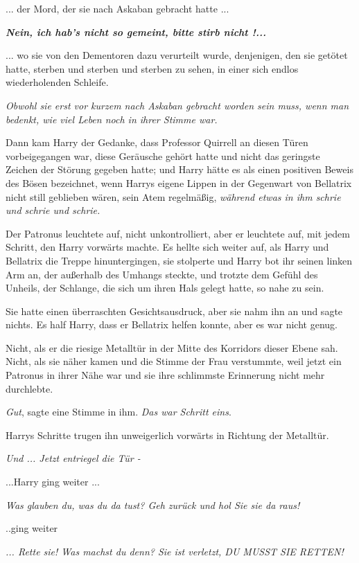 ... der Mord, der sie nach Askaban gebracht hatte ...

\textbf{\emph{\glqq{}Nein, ich hab's
nicht so gemeint, bitte stirb nicht !...\grqq{}} }

... wo sie von den Dementoren dazu verurteilt wurde, denjenigen, den sie getötet
hatte, sterben und sterben und sterben zu sehen, in einer sich endlos
wiederholenden Schleife.

\emph{Obwohl sie erst vor kurzem nach Askaban gebracht worden sein muss, wenn
man bedenkt, wie viel Leben noch in ihrer Stimme war.}

Dann kam Harry der Gedanke, dass Professor Quirrell an diesen Türen
vorbeigegangen war, diese Geräusche gehört hatte und nicht das geringste Zeichen
der Störung gegeben hatte; und Harry hätte es als einen positiven Beweis des
Bösen bezeichnet, wenn Harrys eigene Lippen in der Gegenwart von Bellatrix nicht
still geblieben wären, sein Atem regelmäßig, \emph{während etwas in ihm schrie
und schrie und schrie.}

Der Patronus leuchtete auf, nicht unkontrolliert, aber er leuchtete auf, mit
jedem Schritt, den Harry vorwärts machte. Es hellte sich weiter auf, als Harry
und Bellatrix die Treppe hinuntergingen, sie stolperte und Harry bot ihr seinen
linken Arm an, der außerhalb des Umhangs steckte, und trotzte dem Gefühl des
Unheils, der Schlange, die sich um ihren Hals gelegt hatte, so nahe zu sein.

Sie hatte einen überraschten Gesichtsausdruck, aber sie nahm ihn an und sagte
nichts. Es half Harry, dass er Bellatrix helfen konnte, aber es war nicht genug.

Nicht, als er die riesige Metalltür in der Mitte des Korridors dieser Ebene sah.
Nicht, als sie näher kamen und die Stimme der Frau verstummte, weil jetzt ein
Patronus in ihrer Nähe war und sie ihre schlimmste Erinnerung nicht mehr
durchlebte.

\emph{Gut}, sagte eine Stimme in ihm. \emph{Das war Schritt eins}.

Harrys Schritte trugen ihn unweigerlich vorwärts in Richtung der Metalltür.

\emph{Und ... Jetzt entriegel die Tür -}

...Harry ging weiter ...

\emph{Was glauben du, was du da tust? Geh zurück und hol Sie sie da raus!}

..ging weiter

\emph{... Rette sie! Was machst du denn? Sie ist verletzt, DU MUSST SIE RETTEN!}

